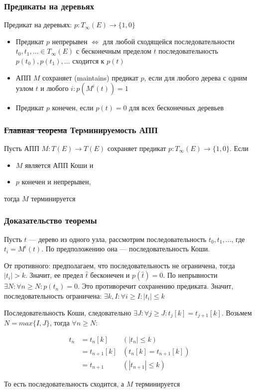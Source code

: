 \documentclass{beamer}
\def\iff{\Leftrightarrow}
\begin{document}
\begin{frame}[fragile]
  \transwipe[direction=90]
  \frametitle{Предикаты на деревьях}
Предикат на деревьях: $p : T_{\infty}(E) \to \{ 1, 0 \}$

\begin{itemize}
  \item Предикат  $p$ непрерывен $\iff$ для любой  сходящейся последовательности $t_0, t_1, \dots \in T_{\infty}(E)$ с бесконечным пределом $t$ последовательность $p(t_0), p(t_1), \dots$ сходится к $p(t)$
  \item АПП $M$ сохраняет (maintains) предикат $p$, если для любого дерева с одним узлом $t$ и любого  $i : p(M^i(t)) = 1$
  \item Предикат $p$ конечен, если $p(t) = 0$ для всех бесконечных деревьев
\end{itemize}
\end{frame}

\begin{frame}[fragile]
  \transwipe[direction=90]
  \frametitle{\sout{Главная теорема} Терминируемость АПП}

  Пусть АПП $M : T(E) \to T(E)$ сохраняет предикат $p: T_{\infty}(E) \to \{ 1, 0 \}$. Если 

  \begin{itemize}
    \item $M$ является АПП Коши и 
    \item $p$ конечен и непрерывен, 
  \end{itemize}

  тогда $M$ терминируется 

\end{frame}

\begin{frame}[fragile]
  \transwipe[direction=90]
  \frametitle{Доказательство теоремы }
Пусть $t$ --- дерево из одного узла, рассмотрим последовательность $t_0, t_1, \dots$, где $t_i = M^i(t)$. По предположению она --- последовательность Коши. 

От противного: предполагаем, что последовательность не ограничена, тогда $|t_i| > k$. Значит, ее предел $\hat{t}$ бесконечен и $p(\hat{t}) = 0$. По непрывности $\exists N : \forall n \geq N : p(t_n) = 0$. Это противоречит сохранению предиката. Значит, последовательность ограничена: $\exists k, I: \forall i \geq I: |t_i| \leq k$

Последовательность Коши, следовательно $\exists J: \forall j \geq J: t_j[k] = t_{j+1}[k]$. Возьмем $N = max\{I, J\}$, тогда  $\forall n \geq N$: 

\begin{align*}
  t_n &= t_n[k]     &(|t_n| \leq k) \\ 
      &= t_{n+1}[k] &(t_n[k] = t_{n+1}[k]) \\ 
      &= t_{n+1}    &(|t_{n+1}| \leq k)
\end{align*}

То есть последовательность сходится, а $M$ терминируется
\end{frame}
\end{document}
